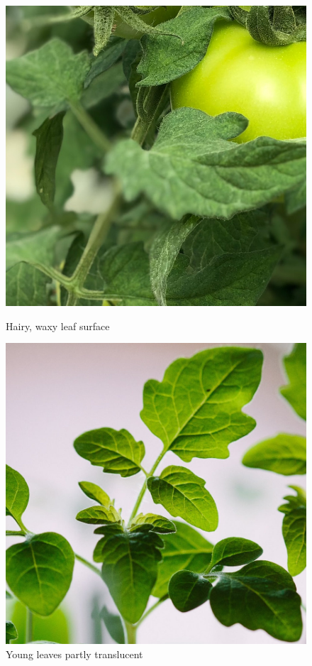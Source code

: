 \begin{figure}[H]
    \centering
    \begin{minipage}[b]{0.49\textwidth}
        \includegraphics[width=\textwidth]{user-view/plant4_leaf_Soo_Ann_Woon_Unsplash.jpg}
        \caption{Hairy, waxy leaf surface}
        \label{fig:wax}
    \end{minipage}
    \hfill
    \begin{minipage}[b]{0.49\textwidth}
        \includegraphics[width=\textwidth]{user-view/plant2_Francesco_Gallarotti_unsplash.jpg}
        \caption{Young leaves partly translucent}
        \label{fig:trans}
    \end{minipage}
\end{figure}

